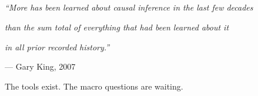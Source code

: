 \documentclass[
  letterpaper,
  DIV=11,
  numbers=noendperiod]{scrartcl}
\begin{document}
\subsection{}\label{section-5}

{\emph{``More has been learned about causal inference in the last few
decades}}

{\emph{than the sum total of everything that had been learned about it}}

{\emph{in all prior recorded history.''}}

{--- Gary King, 2007}

{The tools exist. The macro questions are waiting.}
\end{document}
